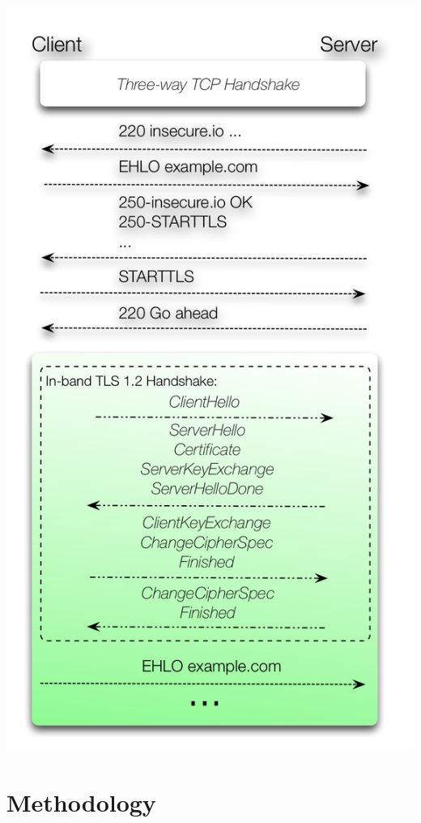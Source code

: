 \documentclass[14pt,aspectratio=43]{beamer}
\begin{document}
\begin{frame}
  \begin{center}
    \includegraphics*[scale=0.38]{images/smtp_starttls_flow.png}
  \end{center}
\end{frame}


\section{Methodology}
\sectionpage
\end{document}
